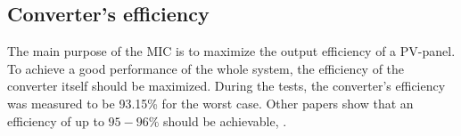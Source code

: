 \subsection{Converter's efficiency}
The main purpose of the MIC is to maximize the output efficiency of a PV-panel. To achieve a good performance of the whole system, the efficiency of the converter itself should be maximized. During the tests, the converter's efficiency was measured to be 93.15\% for the worst case. Other papers show that an efficiency of up to $95-96\%$ should be achievable\cite{underthehood}, \cite{efficient_buckboost}. 